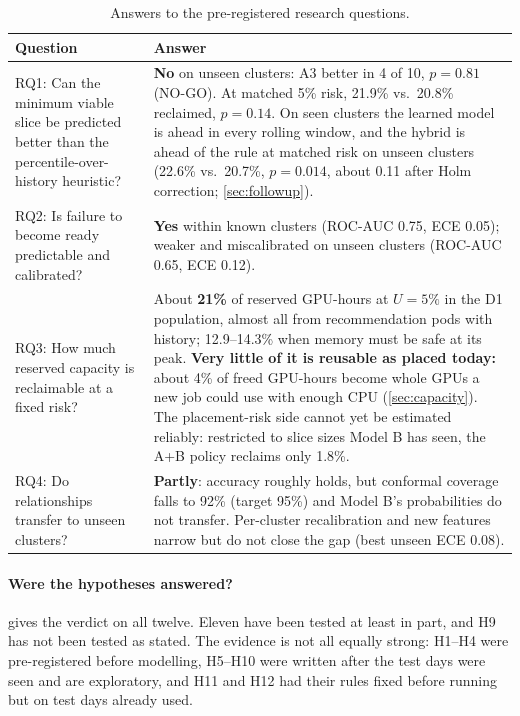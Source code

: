 \documentclass[11pt]{article}
\begin{document}
\begin{table}[h]
\centering\small
\caption{Answers to the pre-registered research questions.}
\label{tab:answers}
\begin{tabularx}{\linewidth}{@{}p{4.4cm}L@{}}
\toprule
Question & Answer \\
\midrule
RQ1: Can the minimum viable slice be predicted better than the percentile-over-history heuristic? & \textbf{No} on unseen clusters: A3 better in 4 of 10, $p = 0.81$ (NO-GO). At matched 5\% risk, 21.9\% vs.\ 20.8\% reclaimed, $p = 0.14$. On seen clusters the learned model is ahead in every rolling window, and the hybrid is ahead of the rule at matched risk on unseen clusters (22.6\% vs.\ 20.7\%, $p = 0.014$, about 0.11 after Holm correction; \cref{sec:followup}). \\
RQ2: Is failure to become ready predictable and calibrated? & \textbf{Yes} within known clusters (ROC-AUC 0.75, ECE 0.05); weaker and miscalibrated on unseen clusters (ROC-AUC 0.65, ECE 0.12). \\
RQ3: How much reserved capacity is reclaimable at a fixed risk? & About \textbf{21\%} of reserved GPU-hours at $U = 5\%$ in the D1 population, almost all from recommendation pods with history; 12.9--14.3\% when memory must be safe at its peak. \textbf{Very little of it is reusable as placed today:} about 4\% of freed GPU-hours become whole GPUs a new job could use with enough CPU (\cref{sec:capacity}). The placement-risk side cannot yet be estimated reliably: restricted to slice sizes Model B has seen, the A+B policy reclaims only 1.8\%. \\
RQ4: Do relationships transfer to unseen clusters? & \textbf{Partly}: accuracy roughly holds, but conformal coverage falls to 92\% (target 95\%) and Model B's probabilities do not transfer. Per-cluster recalibration and new features narrow but do not close the gap (best unseen ECE 0.08). \\
\bottomrule
\end{tabularx}
\end{table}

\paragraph{Were the hypotheses answered?}  gives the verdict on all twelve. Eleven have been tested at least in part, and H9 has not been tested as stated. The evidence is not all equally strong: H1--H4 were pre-registered before modelling, H5--H10 were written after the test days were seen and are exploratory, and H11 and H12 had their rules fixed before running but on test days already used.
\end{document}
